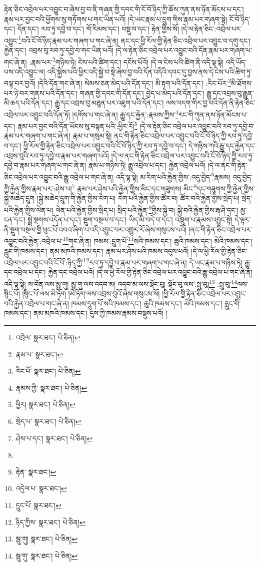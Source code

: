 རྟེན་ཅིང་འབྲེལ་པར་འབྱུང་བ་ཞེས་བྱ་བ་ནི་གཞན་གྱི་དབང་གི་ངོ་བོ་ཉིད་ཀྱི་ཆོས་ཀུན་ནས་ཉོན་མོངས་པ་དང་། རྣམ་པར་བྱང་བའི་ཕྱོགས་སུ་གཏོགས་པ་གང་ཡིན་པའོ། །དེ་ཡང་རྣམ་པ་དྲུག་གིས་རྣམ་པར་གཞག་སྟེ། ངོ་བོ་ཉིད་དང་། དོན་དང་། རབ་ཏུ་དབྱེ་བ་དང་། གོ་རིམས་དང་། བསྡུ་བ་དང་། རྟེན་གྱིས་སོ། །དེ་ལ་རྟེན་ཅིང་:འབྲེལ་པར་འབྱུང་\footnote{འབྲེལ་  སྣར་ཐང་།  པེ་ཅིན། }བའི་ངོ་བོ་ཉིད་རྣམ་པར་གཞག་པ་གང་ཞེ་ན། ནང་དང་ཕྱི་རོལ་གྱི་རྟེན་ཅིང་འབྲེལ་པར་འབྱུང་བ་དགུ་དང་། རྐྱེན་དང་། འབྲས་བུ་རབ་ཏུ་དབྱེ་བ་གང་ཡིན་པའོ། །དེ་ལ་རྟེན་ཅིང་འབྲེལ་པར་འབྱུང་བའི་དོན་རྣམ་པར་གཞག་པ་གང་ཞེ་ན། :རྣམ་པར་\footnote{རྣམ་པ་  སྣར་ཐང་། }གཉིས་ཏེ། ངེས་པའི་ཚིག་དང་། དངོས་པོའོ། །དེ་ལ་ངེས་པའི་ཚིག་ནི་འདི་ལྟ་སྟེ། འདི་ཡོད་པས་འདི་འབྱུང་ལ། འདི་སྐྱེས་པའི་ཕྱིར་འདི་སྐྱེ་བ་སྟེ་ཞེས་བྱ་བའི་དོན་འདིའི་དབང་དུ་བྱས་ནས་དེ་ངེས་པའི་ཚིག་ཏུ་བལྟ་བར་བྱའོ། །དེའི་དོན་གང་ཞེ་ན། སེམས་ཅན་མེད་པའི་དོན་དང་། མི་རྟག་པའི་དོན་དང་། :རིང་པོར་\footnote{རིང་པོ་  སྣར་ཐང་།  པེ་ཅིན། }མི་ཐོགས་པར་ཉེ་བར་གནས་པའི་དོན་དང་། གཞན་གྱི་དབང་གི་དོན་དང་། བྱེད་པ་མེད་པའི་དོན་དང་། རྒྱུ་དང་འབྲས་བུ་རྒྱུན་མི་ཆད་པའི་དོན་དང་། རྒྱུ་དང་འབྲས་བུ་མཐུན་པར་འཇུག་པའི་དོན་དང་། ལས་བདག་གིར་བྱ་བའི་དོན་ནི་རྟེན་ཅིང་འབྲེལ་པར་འབྱུང་བའི་དོན་ཏོ། །དགོས་པ་གང་ཞེ་ན། རྒྱུ་དང་རྐྱེན་:རྣམས་ཀྱིས་\footnote{རྣམས་ཀྱི་  སྣར་ཐང་།  པེ་ཅིན། }རང་གི་ཀུན་ནས་ཉོན་མོངས་པ་དང་། རྣམ་པར་བྱང་བའི་དོན་ཡོངས་སུ་བསྟན་པའི་:ཕྱིར་རོ།\footnote{ཕྱིར།  སྣར་ཐང་།  པེ་ཅིན། } །དེ་ལ་རྟེན་ཅིང་འབྲེལ་པར་འབྱུང་བའི་རབ་ཏུ་དབྱེ་བ་རྣམ་པར་གཞག་པ་གང་ཞེ་ན། རྣམ་པ་གསུམ་སྟེ། ནང་གི་རྟེན་ཅིང་འབྲེལ་པར་འབྱུང་བའི་ངོ་བོ་ཉིད་ཀྱི་རབ་ཏུ་དབྱེ་བ་དང་། ཕྱི་རོལ་གྱི་རྟེན་ཅིང་འབྲེལ་པར་འབྱུང་བའི་ངོ་བོ་ཉིད་ཀྱི་རབ་ཏུ་དབྱེ་བ་དང་། དེ་གཉིས་ཀའི་རྒྱུ་དང་རྐྱེན་དང་འབྲས་བུའི་རབ་ཏུ་དབྱེ་བ་རྣམ་པར་གཞག་པའོ། །དེ་ལ་ནང་གི་རྟེན་ཅིང་འབྲེལ་པར་འབྱུང་བའི་ངོ་བོ་ཉིད་ཀྱི་རབ་ཏུ་དབྱེ་བ་རྣམ་པར་གཞག་པ་གང་ཞེ་ན། རྣམ་པ་གཉིས་ཏེ། རྒྱུ་འབྲེལ་པ་དང་། རྐྱེན་འབྲེལ་པའོ། །དེ་ལ་ནང་གི་རྟེན་ཅིང་འབྲེལ་པར་འབྱུང་བའི་རྒྱུ་འབྲེལ་པ་གང་ཞེ་ན། འདི་ལྟ་སྟེ། མ་རིག་པའི་རྐྱེན་གྱིས་:འདུ་བྱེད་\footnote{སྲེད་པ་  སྣར་ཐང་།  པེ་ཅིན། }རྣམས། འདུ་བྱེད་ཀྱི་རྐྱེན་གྱིས་རྣམ་པར་:ཤེས་པ།\footnote{ཤེས་པ་དང་།  སྣར་ཐང་།  པེ་ཅིན། } རྣམ་པར་ཤེས་པའི་རྐྱེན་གྱིས་མིང་དང་གཟུགས། མིང་\footnote{}དང་གཟུགས་ཀྱི་རྐྱེན་གྱིས་སྐྱེ་མཆེད་དྲུག །སྐྱེ་མཆེད་དྲུག་གི་རྐྱེན་གྱིས་རེག་པ། རེག་པའི་རྐྱེན་གྱིས་ཚོར་བ། ཚོར་བའི་རྐྱེན་གྱིས་སྲེད་པ། སྲེད་པའི་རྐྱེན་གྱིས་ལེན་པ། ལེན་པའི་རྐྱེན་གྱིས་སྲིད་པ། སྲིད་པའི་རྐྱེན་\footnote{རྟེན་  སྣར་ཐང་། }གྱིས་སྐྱེ་བ། སྐྱེ་བའི་རྐྱེན་གྱིས་རྒ་ཤི་དང་། མྱ་ངན་དང་། སྨྲེ་སྔགས་འདོན་པ་དང་། སྡུག་བསྔལ་བ་དང་། ཡིད་མི་བདེ་བ་དང་། འཁྲུག་པ་རྣམས་འབྱུང་སྟེ། དེ་ལྟར་ནི་སྡུག་བསྔལ་གྱི་ཕུང་པོ་འབའ་ཞིག་པ་འདི་འབྱུང་བར་འགྱུར་རོ་ཞེས་གསུངས་པའོ། །ནང་གི་རྟེན་ཅིང་འབྲེལ་པར་འབྱུང་བའི་རྐྱེན་:འབྲེལ་པ་\footnote{འདྲེལ་པ་  སྣར་ཐང་། }གང་ཞེ་ན། ཁམས་:དྲུག་པོ་\footnote{དྲུང་པོ་  སྣར་ཐང་། }སའི་ཁམས་དང་། ཆུའི་ཁམས་དང་། མེའི་ཁམས་དང་། རླུང་གི་ཁམས་དང་། ནམ་མཁའི་ཁམས་དང་། རྣམ་པར་ཤེས་པའི་ཁམས་འདུས་པའོ། །དེ་ལ་ཕྱི་རོལ་གྱི་རྟེན་ཅིང་འབྲེལ་པར་འབྱུང་བའི་ངོ་བོ་:ཉིད་ཀྱི་\footnote{ཉིད་ཀྱིས་  སྣར་ཐང་།  པེ་ཅིན། }རབ་ཏུ་དབྱེ་བ་རྣམ་པར་གཞག་པ་གང་ཞེ་ན། དེ་ཡང་རྣམ་པ་གཉིས་ཏེ། རྒྱུ་དང་འབྲེལ་པ་དང་། རྐྱེན་དང་འབྲེལ་པའོ། །དེ་ལ་ཕྱི་རོལ་གྱི་རྟེན་ཅིང་འབྲེལ་པར་འབྱུང་བའི་རྒྱུ་འབྲེལ་པ་གང་ཞེ་ན། འདི་ལྟ་སྟེ། ས་བོན་ལས་མྱུ་གུ། མྱུ་གུ་ལས་འདབ་མ། འདབ་མ་ལས་སྡོང་བུ། སྡོང་བུ་ལས་:སྦུ་བུ།\footnote{སྦུ་གུ།  སྣར་ཐང་།  པེ་ཅིན། } :སྦུ་བུ་\footnote{སྦུ་གུ་  སྣར་ཐང་།  པེ་ཅིན། }ལས་སྙིང་པོ། །སྙིང་པོ་ལས་མེ་ཏོག །མེ་ཏོག་ལས་འབྲས་བུའོ་ཞེས་གསུངས་སོ། །ཕྱི་རོལ་གྱི་རྟེན་ཅིང་འབྲེལ་པར་འབྱུང་བའི་རྐྱེན་འབྲེལ་པ་གང་ཞེ་ན། ཁམས་དྲུག་པོ་སའི་ཁམས་དང་། ཆུའི་ཁམས་དང་། མེའི་ཁམས་དང་། རླུང་གི་ཁམས་དང་། ནམ་མཁའི་ཁམས་དང་། དུས་ཀྱི་ཁམས་རྣམས་བསྡུས་པའོ། །
